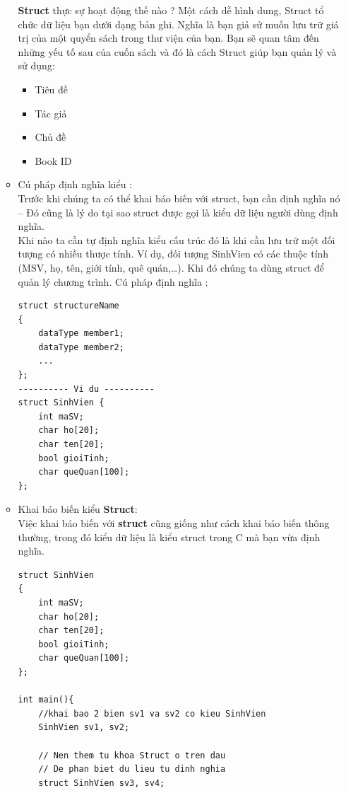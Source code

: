 \documentclass[12pt,a4paper]{article}
\begin{document}
\begin{itemize}
\begin{itemize}
\textbf{Struct} thực sự hoạt động thế nào ? Một cách dễ hình dung, Struct tổ chức dữ liệu bạn dưới dạng bản ghi. Nghĩa là bạn giả sử muốn lưu trữ giá trị của một quyển sách trong thư viện của bạn. Bạn sẽ quan tâm đến những yếu tố sau của cuốn sách và đó là cách Struct giúp bạn quản lý và sử dụng:
\begin{itemize}
\item Tiêu đề
\item Tác giả
\item Chủ đề
\item Book ID
\end{itemize}

\item {\large Cú pháp định nghĩa kiểu :}\\
Trước khi chúng ta có thể khai báo biến với struct, bạn cần định nghĩa nó – Đó cũng là lý do tại sao struct được gọi là kiểu dữ liệu người dùng định nghĩa.\\
Khi nào ta cần tự định nghĩa kiểu cấu trúc đó là khi cần lưu trữ một đối tượng có nhiều thược tính. Ví dụ, đối tượng SinhVien có các thuộc tính (MSV, họ, tên, giới tính, quê quán,…). Khi đó chúng ta dùng struct để quản lý chương trình. Cú pháp định nghĩa :
\begin{lstlisting}
struct structureName 
{
    dataType member1;
    dataType member2;
    ...
};
---------- Vi du ----------
struct SinhVien {
    int maSV;
    char ho[20];
    char ten[20];
    bool gioiTinh;
    char queQuan[100];
};
\end{lstlisting}

\item {\large Khai báo biến kiểu \textbf{Struct}}:\\
Việc khai báo biến với \textbf{struct} cũng giống như cách khai báo biến thông thường, trong đó kiểu dữ liệu là kiểu struct trong C mà bạn vừa định nghĩa.
\begin{lstlisting}
struct SinhVien
{
    int maSV;
    char ho[20];
    char ten[20];
    bool gioiTinh;
    char queQuan[100];
};
 
int main(){
	//khai bao 2 bien sv1 va sv2 co kieu SinhVien
    SinhVien sv1, sv2;
 
    // Nen them tu khoa Struct o tren dau
    // De phan biet du lieu tu dinh nghia 
    struct SinhVien sv3, sv4;
 

\end{lstlisting}
\end{itemize}
\end{itemize}
\end{document}
